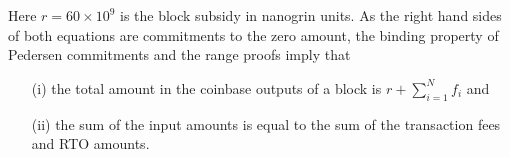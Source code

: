 Here $r = 60\times 10^9$ is the block subsidy in nanogrin units.
As the right hand sides of both equations are commitments to the zero amount, the binding property of Pedersen commitments and the range proofs imply that
\begin{enumerate}
  \item[(i)] the total amount in the coinbase outputs of a block is $r + \sum_{i=1}^{N} f_i$ and
  \item [(ii)] the sum of the input amounts is equal to the sum of the transaction fees and RTO amounts.
\end{enumerate}
%


